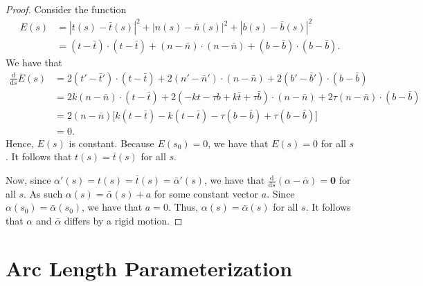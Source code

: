 \documentclass[10pt]{article}
\newcommand{\dee}{\mathrm{d}}
\newcommand{\ve}[1]{\mathbf{#1}}
\begin{document}
\begin{itemize}
\begin{proof}
      Consider the function 
      \begin{align*}
        E(s) &= |t(s) - \bar t(s)|^2 + | n(s) - \bar n(s) |^2 + | b(s) - \bar b(s) |^2\\
        &= (t-\bar t) \cdot (t - \bar t) + (n - \bar n) \cdot (n - \bar n) + (b - \bar b) \cdot (b-\bar b).
      \end{align*}
      We have that
      \begin{align*}
        \frac{\dee}{\dee s} E(s) 
        &= 2(t' - \bar t')\cdot(t - \bar t) + 2(n' - \bar n')\cdot(n - \bar n) + 2(b' - \bar b')\cdot(b - \bar b)\\
        &= 2k(n - \bar n)\cdot(t - \bar t) + 2(-kt-\tau b + k\bar t + \tau \bar b) \cdot (n - \bar n) + 2\tau ( n - \bar n) \cdot (b - \bar b)\\
        &= 2(n - \bar n ) \big[ k(t - \bar t) -k (t - \bar t) - \tau (b - \bar b) + \tau (b - \bar b) \big]\\
        &= 0.
      \end{align*}
      Hence, $E(s)$ is constant. Because $E(s_0) = 0$, we have that $E(s) = 0$ for all $s$. It follows that $t(s) = \bar t(s)$ for all $s$. 

      Now, since $\alpha'(s) = t(s) = \bar t(s) = \bar \alpha'(s)$, we have that $\frac{\dee}{\dee s} (\alpha - \bar\alpha) = \ve{0}$ for all $s$. As such $\alpha(s) = \bar \alpha(s) + a$ for some constant vector $a$. Since $\alpha(s_0) = \bar \alpha(s_0)$, we have that $a = 0$. Thus, $\alpha(s) = \bar \alpha(s)$ for all $s$. It follows that $\alpha$ and $\bar \alpha$ differs by a rigid motion.
    \end{proof}
  \end{itemize}  

  \section{Arc Length Parameterization} %
  \label{sec:arc_length_parameterization}
  
\end{document}
